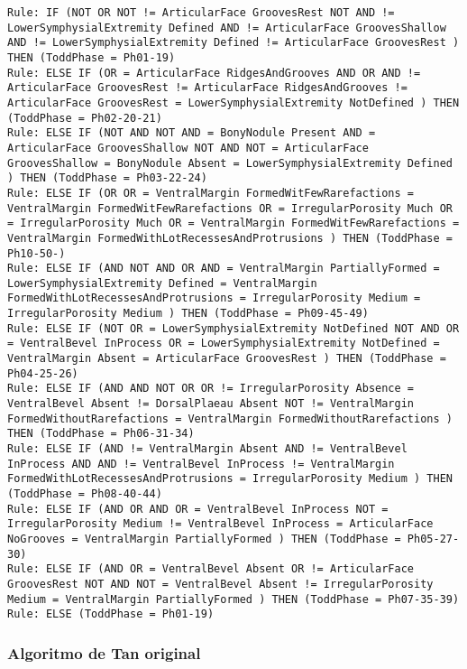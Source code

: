 \begin{lstlisting}
Rule: IF (NOT OR NOT != ArticularFace GroovesRest NOT AND != LowerSymphysialExtremity Defined AND != ArticularFace GroovesShallow AND != LowerSymphysialExtremity Defined != ArticularFace GroovesRest ) THEN (ToddPhase = Ph01-19)
Rule: ELSE IF (OR = ArticularFace RidgesAndGrooves AND OR AND != ArticularFace GroovesRest != ArticularFace RidgesAndGrooves != ArticularFace GroovesRest = LowerSymphysialExtremity NotDefined ) THEN (ToddPhase = Ph02-20-21)
Rule: ELSE IF (NOT AND NOT AND = BonyNodule Present AND = ArticularFace GroovesShallow NOT AND NOT = ArticularFace GroovesShallow = BonyNodule Absent = LowerSymphysialExtremity Defined ) THEN (ToddPhase = Ph03-22-24)
Rule: ELSE IF (OR OR = VentralMargin FormedWitFewRarefactions = VentralMargin FormedWitFewRarefactions OR = IrregularPorosity Much OR = IrregularPorosity Much OR = VentralMargin FormedWitFewRarefactions = VentralMargin FormedWithLotRecessesAndProtrusions ) THEN (ToddPhase = Ph10-50-)
Rule: ELSE IF (AND NOT AND OR AND = VentralMargin PartiallyFormed = LowerSymphysialExtremity Defined = VentralMargin FormedWithLotRecessesAndProtrusions = IrregularPorosity Medium = IrregularPorosity Medium ) THEN (ToddPhase = Ph09-45-49)
Rule: ELSE IF (NOT OR = LowerSymphysialExtremity NotDefined NOT AND OR = VentralBevel InProcess OR = LowerSymphysialExtremity NotDefined = VentralMargin Absent = ArticularFace GroovesRest ) THEN (ToddPhase = Ph04-25-26)
Rule: ELSE IF (AND AND NOT OR OR != IrregularPorosity Absence = VentralBevel Absent != DorsalPlaeau Absent NOT != VentralMargin FormedWithoutRarefactions = VentralMargin FormedWithoutRarefactions ) THEN (ToddPhase = Ph06-31-34)
Rule: ELSE IF (AND != VentralMargin Absent AND != VentralBevel InProcess AND AND != VentralBevel InProcess != VentralMargin FormedWithLotRecessesAndProtrusions = IrregularPorosity Medium ) THEN (ToddPhase = Ph08-40-44)
Rule: ELSE IF (AND OR AND OR = VentralBevel InProcess NOT = IrregularPorosity Medium != VentralBevel InProcess = ArticularFace NoGrooves = VentralMargin PartiallyFormed ) THEN (ToddPhase = Ph05-27-30)
Rule: ELSE IF (AND OR = VentralBevel Absent OR != ArticularFace GroovesRest NOT AND NOT = VentralBevel Absent != IrregularPorosity Medium = VentralMargin PartiallyFormed ) THEN (ToddPhase = Ph07-35-39)
Rule: ELSE (ToddPhase = Ph01-19)
\end{lstlisting}


\subsubsection{Algoritmo de Tan original}

